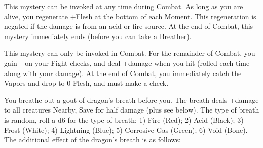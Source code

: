 {This mystery can be invoked at any time during Combat.  As long as you are alive, you regenerate +\DICE Flesh at the bottom of each Moment.  This regeneration is negated if the damage is from an acid or fire source. At the end of Combat, this mystery immediately ends (before you can take a Breather).

\MYSTERY [
  Name = Witness Me,
  Link = arcana-mystery-witness-me,
  Paradigm = Death,
  Save = n/a,
  Duration = Combat,
  Target = Self
]

This mystery can only be invoked in Combat.  For the remainder of Combat, you gain +\DICE on your Fight checks, and deal +\SUMDICE damage when you hit (rolled each time along with your damage).  At the end of Combat, you immediately catch the Vapors and drop to 0 Flesh, and must make a \DEATH check.

\newpage

\MYSTERY [
  Name = Dragonbreath,
  Link = arcana-mystery-dragonbreath,
  Paradigm = Elements,
  Save = Y (half),
  Duration = Instant,
  Target = Nearby
]

You breathe out a gout of dragon's breath before you.  The breath deals \SUMDICE+\DICE damage to all creatures Nearby, Save for half damage (plus see below).  The type of breath is random, roll a d6 for the type of breath: 1) Fire (Red); 2) Acid (Black); 3) Frost (White); 4) Lightning (Blue); 5) Corrosive Gas (Green); 6) Void (Bone).  The additional effect of the dragon's breath is as follows:


}
